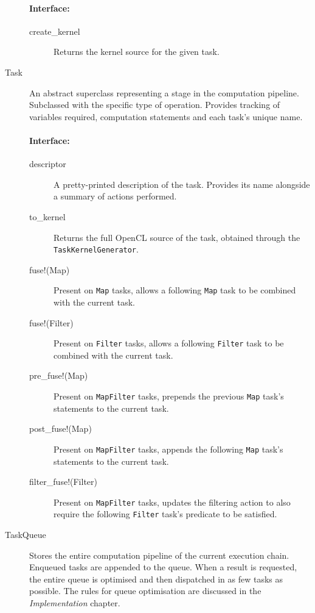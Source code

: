 \begin{description}
\paragraph*{Interface:}
\begin{description}
  \item[create\_kernel] Returns the kernel source for the given task.
\end{description}

\item[Task]
An abstract superclass representing a stage in the computation pipeline. Subclassed with the specific type of operation. Provides tracking of variables required, computation statements and each task's unique name.

\paragraph*{Interface:}
\begin{description}
  \item[descriptor] A pretty-printed description of the task. Provides its name alongside a summary of actions performed.

  \item[to\_kernel] Returns the full \ac{OpenCL} source of the task, obtained through the \verb|TaskKernelGenerator|.

  \item[fuse!(Map)] Present on \verb|Map| tasks, allows a following \verb|Map| task to be combined with the current task.

  \item[fuse!(Filter)] Present on \verb|Filter| tasks, allows a following \verb|Filter| task to be combined with the current task.

  \item[pre\_fuse!(Map)] Present on \verb|MapFilter| tasks, prepends the previous \verb|Map| task's statements to the current task.

  \item[post\_fuse!(Map)] Present on \verb|MapFilter| tasks, appends the following \verb|Map| task's statements to the current task.

  \item[filter\_fuse!(Filter)] Present on \verb|MapFilter| tasks, updates the filtering action to also require the following \verb|Filter| task's predicate to be satisfied.
\end{description}

\item[TaskQueue]
Stores the entire computation pipeline of the current execution chain. Enqueued tasks are appended to the queue. When a result is requested, the entire queue is optimised and then dispatched in as few tasks as possible. The rules for queue optimisation are discussed in the \emph{Implementation} chapter.


\end{description}
